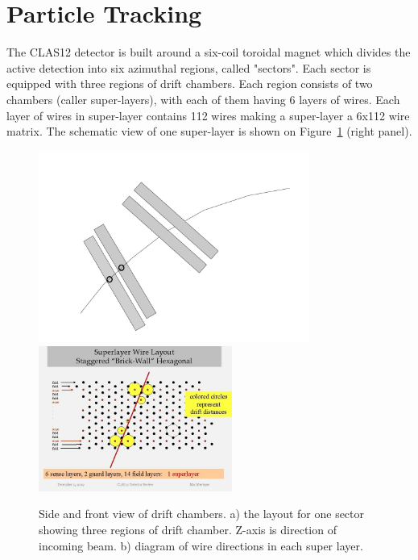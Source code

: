 \section{Particle Tracking}

The CLAS12\cite{Burkert:2020akg} detector is built around a six-coil toroidal magnet which divides the active detection into six azimuthal regions, called "sectors". Each sector is equipped with three regions of drift chambers. Each region consists of two chambers (caller super-layers), with each of them having 6 layers of wires. Each layer of wires in super-layer contains 112 wires making a super-layer a 6x112 wire matrix. The schematic view of one super-layer is shown on Figure~\ref{dc:side_view} (right panel).

\begin{figure}[!ht]
\begin{center}
 \includegraphics[width=3.5in]{images/dc_side_view.pdf}
 \includegraphics[width=2.5in]{images/image-29.jpg}
\caption {Side and front view of drift chambers. a) the layout for one sector showing three regions of drift chamber. Z-axis is direction of incoming beam. b) diagram of wire directions in each super layer.}
 \label{dc:side_view}
 \end{center}
\end{figure}

